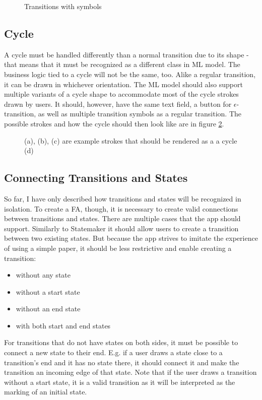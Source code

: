 \begin{figure}
    \centering
    \caption{Transitions with symbols}\label{transition-symbols}
\end{figure}

\subsection{Cycle}

A cycle must be handled differently than a normal transition due to its shape - that means that it must be recognized as a different class in ML model. The business logic tied to a cycle will not be the same, too. Alike a regular transition, it can be drawn in whichever orientation. The ML model should also support multiple variants of a cycle shape to accommodate most of the cycle strokes drawn by users. It should, however, have the same text field, a button for $\epsilon$-transition, as well as multiple transition symbols as a regular transition. The possible strokes and how the cycle should then look like are in figure \ref{cycle}.

\begin{figure}
    \centering
    \caption{(a), (b), (c) are example strokes that should be rendered as a a cycle (d)}\label{cycle}
\end{figure}

\subsection{Connecting Transitions and States}

So far, I have only described how transitions and states will be recognized in isolation. To create a FA, though, it is necessary to create valid connections between transitions and states. There are multiple cases that the app should support. Similarly to Statemaker \cite{state-maker} it should allow users to create a transition between two existing states. But because the app strives to imitate the experience of using a simple paper, it should be less restrictive and enable creating a transition:
\begin{itemize}
    \item without any state
    \item without a start state
    \item without an end state
    \item with both start and end states
\end{itemize}
For transitions that do not have states on both sides, it must be possible to connect a new state to their end. E.g. if a user draws a state close to a transition's end and it has no state there, it should connect it and make the transition an incoming edge of that state. Note that if the user draws a transition without a start state, it is a valid transition as it will be interpreted as the marking of an initial state.

